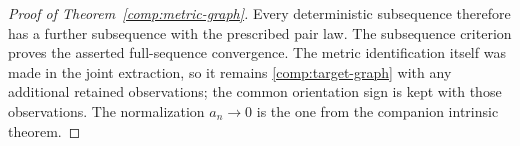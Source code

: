 \begin{proof}[Proof of Theorem~\ref{comp:metric-graph}]
Every deterministic subsequence therefore has a further
subsequence with the prescribed pair law.  The subsequence
criterion proves the asserted full-sequence convergence.
The metric identification itself was made in the joint
extraction, so it remains \eqref{comp:target-graph} with any
additional retained observations; the common orientation sign
is kept with those observations.  The normalization $a_n\to0$
is the one from the companion intrinsic theorem.
\end{proof}
